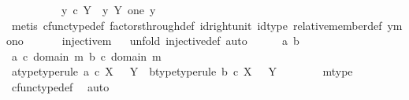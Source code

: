 \begin{isabellebody}
\ \ \isamarkupfalse%
\ \isanewline
\ \ \ \ \isamarkupfalse%
\ {\isachardoublequoteopen}y{}\ {\isasymin}\isactrlsub c\ Y\ {\isasymLongrightarrow}\ y{}\ {\isasymin}\isactrlbsub Y\isactrlesub \ {\isacharparenleft}{\kern0pt}one{\isacharcomma}{\kern0pt}\ y{}{\isacharparenright}{\kern0pt}{\isachardoublequoteclose}\isanewline
\ \ \ \ \ \ \isamarkupfalse%
\ {\isacharparenleft}{\kern0pt}metis\ cfunc{\isacharunderscore}{\kern0pt}type{\isacharunderscore}{\kern0pt}def\ factors{\isacharunderscore}{\kern0pt}through{\isacharunderscore}{\kern0pt}def\ id{\isacharunderscore}{\kern0pt}right{\isacharunderscore}{\kern0pt}unit{}\ id{\isacharunderscore}{\kern0pt}type\ relative{\isacharunderscore}{\kern0pt}member{\isacharunderscore}{\kern0pt}def{}\ y{}{\isacharunderscore}{\kern0pt}mono{\isacharparenright}{\kern0pt}\isanewline
\ \ \isamarkupfalse%
\isanewline
\isanewline
\isanewline
\ \ \isamarkupfalse%
\ {\isachardoublequoteopen}injective{\isacharparenleft}{\kern0pt}m{\isacharparenright}{\kern0pt}{\isachardoublequoteclose}\isanewline
\ \ \isamarkupfalse%
{\isacharparenleft}{\kern0pt}unfold\ injective{\isacharunderscore}{\kern0pt}def\ {\isacharcomma}{\kern0pt}auto{\isacharparenright}{\kern0pt}\isanewline
\ \ \ \ \isamarkupfalse%
\ a\ b\ \isanewline
\ \ \ \ \isamarkupfalse%
\ {\isachardoublequoteopen}a\ {\isasymin}\isactrlsub c\ domain\ m{\isachardoublequoteclose}\ {\isachardoublequoteopen}b\ {\isasymin}\isactrlsub c\ domain\ m{\isachardoublequoteclose}\isanewline
\ \ \ \ \isamarkupfalse%
\ \isamarkupfalse%
\ a{\isacharunderscore}{\kern0pt}type{\isacharbrackleft}{\kern0pt}type{\isacharunderscore}{\kern0pt}rule{\isacharbrackright}{\kern0pt}{\isacharcolon}{\kern0pt}\ {\isachardoublequoteopen}a\ {\isasymin}\isactrlsub c\ X\ \ {\isasymCoprod}\ Y{\isachardoublequoteclose}\ \ b{\isacharunderscore}{\kern0pt}type{\isacharbrackleft}{\kern0pt}type{\isacharunderscore}{\kern0pt}rule{\isacharbrackright}{\kern0pt}{\isacharcolon}{\kern0pt}\ {\isachardoublequoteopen}b\ {\isasymin}\isactrlsub c\ X\ \ {\isasymCoprod}\ Y{\isachardoublequoteclose}\isanewline
\ \ \ \ \ \ \isamarkupfalse%
\ m{\isacharunderscore}{\kern0pt}type\ \isamarkupfalse%
\ cfunc{\isacharunderscore}{\kern0pt}type{\isacharunderscore}{\kern0pt}def\ \isamarkupfalse%
\ auto\isanewline
\ \ \ \ \isamarkupfalse%

\end{isabellebody}
